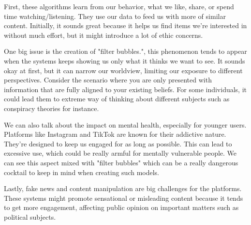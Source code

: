First, these algorithms learn from our behavior, what we like, share, or spend time watching/listening. They use our data to feed us with more of similar content. Initially, it sounds great because it helps us find items we're interested in without much effort, but it might introduce a lot of ethic concerns.

One big issue is the creation of "filter bubbles.", this phenomenon tends to appear when the systems keeps showing us only what it thinks we want to see. It sounds okay at first, but it can narrow our worldview, limiting our exposure to different perspectives. Consider the scenario where you are only presented with information that are fully aligned to your existing beliefs. For some individuals, it could lead them to extreme way of thinking about different subjects such as conspiracy theories for instance.

We can also talk about the impact on mental health, especially for younger users. Platforms like Instagram and TikTok are known for their addictive nature. They're designed to keep us engaged for as long as possible. This can lead to excessive use, which could be really armful for mentally vulnerable people. We can see this aspect mixed with "filter bubbles" which can be a really dangerous cocktail to keep in mind when creating such models.

Lastly, fake news and content manipulation are big challenges for the platforms. These systems might promote sensational or misleading content because it tends to get more engagement, affecting public opinion on important matters such as political subjects.
